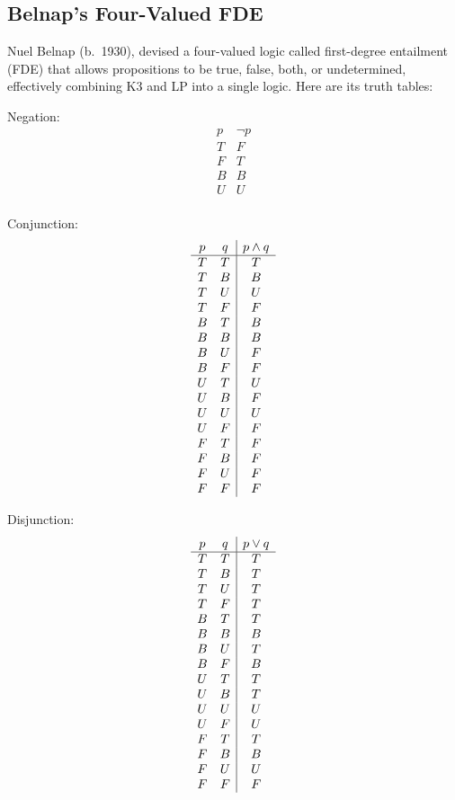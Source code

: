 \documentclass[11pt]{article}
\theoremstyle{definition}
\theoremstyle{remark}
\begin{document}
\subsection{Belnap's Four-Valued FDE}
Nuel Belnap (b.\ 1930), devised a four-valued logic called first-degree entailment (FDE) that allows propositions to be true, false, both, or undetermined, effectively combining K3 and LP into a single logic. Here are its truth tables:\par 
\vspace{12pt}
\noindent
Negation:
\[
\begin{array}{c|c}
p & \lnot p \\
\hline
T & F \\
F & T \\
B & B \\
U & U \\
\end{array}
\]\par

Conjunction:
\[
\begin{array}{c c|c}
p & q & p \wedge q \\
\hline
T & T & T \\
T & B & B \\
T & U & U \\
T & F & F \\
B & T & B \\
B & B & B \\
B & U & F \\
B & F & F \\
U & T & U \\
U & B & F \\
U & U & U \\
U & F & F \\
F & T & F \\
F & B & F \\
F & U & F \\
F & F & F \\
\end{array}
\]\par

Disjunction:
\[
\begin{array}{c c|c}
p & q & p \vee q \\
\hline
T & T & T \\
T & B & T \\
T & U & T \\
T & F & T \\
B & T & T \\
B & B & B \\
B & U & T \\
B & F & B \\
U & T & T \\
U & B & T \\
U & U & U \\
U & F & U \\
F & T & T \\
F & B & B \\
F & U & U \\
F & F & F \\
\end{array}
\]\par
\end{document}
